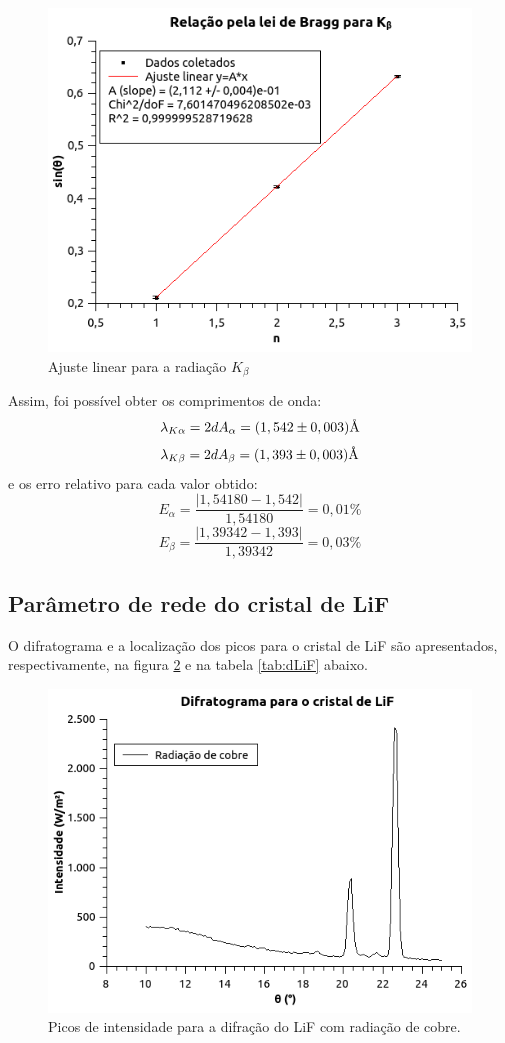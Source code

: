 \documentclass[article,12pt,openright,oneside,a4paper,brazil]{abntex2}
\begin{document}
\begin{figure}[H]
    \centering
    \includegraphics[scale=0.8]{Figuras/Kb.png}
    \caption{Ajuste linear para a radiação $K_\beta$}
    \label{fig:kbr-kb}
\end{figure}

Assim, foi possível obter os comprimentos de onda:
$$\lambda_{K\alpha}=2dA_\alpha=(1,542\pm0,003)\text{\normalfont\AA}$$
$$\lambda_{K\beta}=2dA_\beta=(1,393\pm0,003)\text{\normalfont\AA}$$
e os erro relativo para cada valor obtido:
$$E_\alpha=\frac{|1,54180-1,542|}{1,54180}=0,01\%$$
$$E_\beta=\frac{|1,39342-1,393|}{1,39342}=0,03\%$$

\subsection{Parâmetro de rede do cristal de LiF}

O difratograma e a localização dos picos para o cristal de LiF são apresentados, respectivamente, na figura \ref{fig:LiF} e na tabela \ref{tab:dLiF} abaixo.

\begin{figure}[H]
    \centering
    \includegraphics[scale=0.8]{Figuras/LiF.png}
    \caption{Picos de intensidade para a difração do LiF com radiação de cobre.}
    \label{fig:LiF}
\end{figure}
\end{document}
